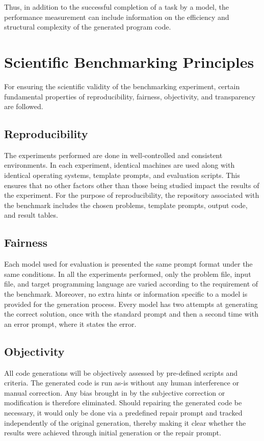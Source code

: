 \documentclass[12pt,a4paper]{report}
\begin{document}
Thus, in addition to the successful completion of a task by a model, the performance measurement can include information on the efficiency and structural complexity of the generated program code.

\section{Scientific Benchmarking Principles}
For ensuring the scientific validity of the benchmarking experiment, certain fundamental properties of reproducibility, fairness, objectivity, and transparency are followed.

\subsection{Reproducibility}
The experiments performed are done in well-controlled and consistent environments. In each experiment, identical machines are used along with identical operating systems, template prompts, and evaluation scripts. This ensures that no other factors other than those being studied impact the results of the experiment. For the purpose of reproducibility, the repository associated with the benchmark includes the chosen problems, template prompts, output code, and result tables.

\subsection{Fairness}
Each model used for evaluation is presented the same prompt format under the same conditions. In all the experiments performed, only the problem file, input file, and target programming language are varied according to the requirement of the benchmark. Moreover, no extra hints or information specific to a model is provided for the generation process. Every model has two attempts at generating the correct solution, once with the standard prompt and then a second time with an error prompt, where it states the error.
\subsection{Objectivity}
All code generations will be objectively assessed by pre-defined scripts and criteria. The generated code is run as-is without any human interference or manual correction. Any bias brought in by the subjective correction or modification is therefore eliminated. Should repairing the generated code be necessary, it would only be done via a predefined repair prompt and tracked independently of the original generation, thereby making it clear whether the results were achieved through initial generation or the repair prompt.
\end{document}

